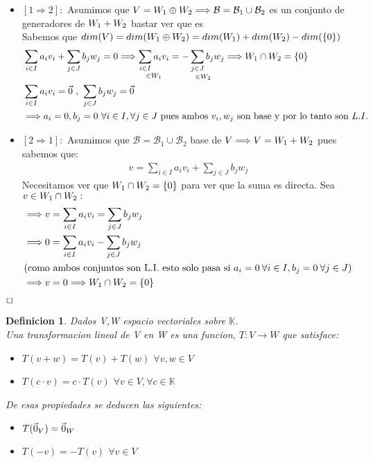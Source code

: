 \documentclass[]{article}
\newtheorem{definition}{Definicion}
\newenvironment{proof}{\noindent{\bf Prueba:}}{$\hfill \Box$ \vspace{10pt}}
\newcommand{\K}{
    \mathbb{K}
}
\newcommand{\ida}{\Longrightarrow}
\newcommand{\base}{\mathcal{B}}
\begin{document}
\begin{proof}
    \begin{itemize}
        \item $[1 \ida 2]:$ Asumimos que $V=\W{1}\oplus\W{2} \ida \base = \base_1 \cup \base_2$ es un conjunto de generadores de
        $\text{$W_{1}$}+\text{$W_{2}$}$ bastar ver que es \li\\
        Sabemos que $dim(V)=dim(\text{$W_{1}$}\oplus\text{$W_{2}$})=dim(\text{$W_{1}$})+dim(\text{$W_{2}$})-dim(\text{$\{ {0} \}$})$
        \begin{align*}
            &\sum_{i \in I} a_i v_i + \sum_{j \in J} b_j w_j = 0 \ida
            \underset{\in \W{1}}{\sum_{i \in I} a_i v_i} = \underset{\in \W{2}}{-\sum_{j \in J} b_j w_j} \ida \W{1}\cap\W{2}=\conjunto{0}\\
            &\sum_{i \in I} a_i v_i =  \cero \text{ , } \sum_{j \in J} b_j w_j = \cero\\
            &\ida a_i=0,b_j=0 \text{ $\forall i \in I, \forall j \in J$ pues ambos $v_i,w_j$ son base y por lo tanto son } \li
        \end{align*}
        \item $[2 \ida 1]:$ Asumimos que $\base=\base_1 \cup \base_2$  base de $V \ida V=\W{1}+\W{2}$ pues sabemos que:
        \begin{align*}
            v=\sum_{i \in I}a_i v_i + \sum_{j \in J}b_j w_j
        \end{align*}
        Necesitamos ver que $\text{$W_{1}$}\cap\text{$W_{2}$}=\text{$\{ {0} \}$}$ para ver que la suma es directa. Sea $v\in\text{$W_{1}$}\cap\text{$W_{2}$}:$
        \begin{align*}
            &\ida v=\sum_{i \in I}a_i v_i = \sum_{j \in J}b_j w_j\\
            &\ida 0=\sum_{i \in I}a_i v_i - \sum_{j \in J}b_j w_j\\
            &(\text{como ambos conjuntos son L.I. esto solo pasa si } a_i=0 \:\forall i \in I,b_j=0 \:\forall j \in J)\\
            &\ida v=0\ida \W{1}\cap\W{2}=\conjunto{0}
        \end{align*}
    \end{itemize}
\end{proof}

\newpage
\begin{definition}
    Dados V,W espacio vectoriales sobre $\K$.\\
    Una transformacion lineal de V en W es una funcion, $T:V \rightarrow W$ que satisface:
    \begin{itemize}
        \item $T(v+w)=T(v)+T(w)$ \quad $\forall v,w \in V$
        \item $T(c\cdot v)= c\cdot T(v)$ \quad $\forall v\in V, \forall c \in \K$
    \end{itemize}
    De esas propiedades se deducen las siguientes:
    \begin{itemize}
        \item $T(\text{$\vec{0}$}_V)=\text{$\vec{0}$}_W$
        \item $T(-v)=-T(v)$ \quad $\forall v \in V$
    \end{itemize}
\end{definition}
\end{document}

